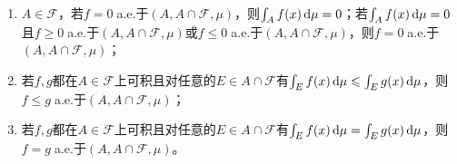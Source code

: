 \begin{property}
\begin{enumerate}
		\begin{equation*}
			\int_{A}f(x)\dif\mu=\int_{A}g(x)\dif\mu
		\end{equation*}
		\item $A\in\mathscr{F}$，若$f=0\;$a.e.于$(A,A\cap\mathscr{F},\mu)$，则$\int_{A}f(x)\mathop{}\!\mathrm{d}\mu=0$；若$\int_{A}f(x)\mathop{}\!\mathrm{d}\mu=0$且$f\geqslant0\;$a.e.于$(A,A\cap\mathscr{F},\mu)$或$f\leqslant0\;$a.e.于$(A,A\cap\mathscr{F},\mu)$，则$f=0\;$a.e.于$(A,A\cap\mathscr{F},\mu)$；
		\item 若$f,g$都在$A\in\mathscr{F}$上可积且对任意的$E\in A\cap\mathscr{F}$有$\int_{E}f(x)\mathop{}\!\mathrm{d}\mu\leqslant\int_{E}g(x)\mathop{}\!\mathrm{d}\mu$，则$f\leqslant g\;$a.e.于$(A,A\cap\mathscr{F},\mu)$；
		\item 若$f,g$都在$A\in\mathscr{F}$上可积且对任意的$E\in A\cap\mathscr{F}$有$\int_{E}f(x)\mathop{}\!\mathrm{d}\mu=\int_{E}g(x)\mathop{}\!\mathrm{d}\mu$，则$f=g\;$a.e.于$(A,A\cap\mathscr{F},\mu)$。
	\end{enumerate}
\end{property}
